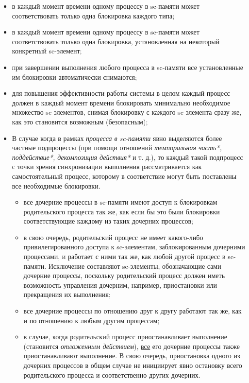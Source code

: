 \begin{itemize}
	\item в каждый момент времени одному процессу в sc-памяти может соответствовать только одна блокировка каждого типа;
	\item в каждый момент времени одному процессу в sc-памяти может соответствовать только одна блокировка, установленная на некоторый конкретный sc-элемент;
	\item при завершении выполнения любого процесса в sc-памяти все установленные им блокировки автоматически снимаются;
	\item для повышения эффективности работы системы в целом каждый процесс должен в каждый момент времени блокировать минимально необходимое множество sc-элементов, снимая блокировку с каждого sc-элемента сразу же, как это становится возможным (безопасным);
	\item В случае когда в рамках \textit{процесса в sc-памяти} явно выделяются более частные подпроцессы (при помощи отношений \textit{темпоральная часть*, поддействие*, декомпозиция действия*} и т. д.), то каждый такой подпроцесс с точки зрения синхронизации выполнения рассматривается как самостоятельный процесс, которому в соответствие могут быть поставлены все необходимые блокировки.
	\begin{itemize}
		\item все дочерние процессы в sc-памяти имеют доступ к блокировкам родительского процесса так же, как если бы это были блокировки соответствующие каждому из таких дочерних процессов;
		\item в свою очередь, родительский процесс не имеет какого-либо привилегированного доступа к sc-элементам, заблокированным дочерними процессами, и работает с ними так же, как любой другой процесс в sc-памяти. Исключение составляют sc-элементы, обозначающие сами дочерние процессы, поскольку родительский процесс должен иметь возможность управления дочерним, например, приостановки или прекращения их выполнения;
		\item все дочерние процессы по отношению друг к другу работают так же, как и по отношению к любым другим процессам;
		\item в случае, когда родительский процесс приостанавливает выполнение (становится \textit{отложенным действием}), \uline{все} его дочерние процессы также приостанавливают выполнение. В свою очередь, приостановка одного из дочерних процессов в общем случае не инициирует явно остановку всего родительского процесса и соответственно других дочерних.
		\end{itemize}
\end{itemize}

